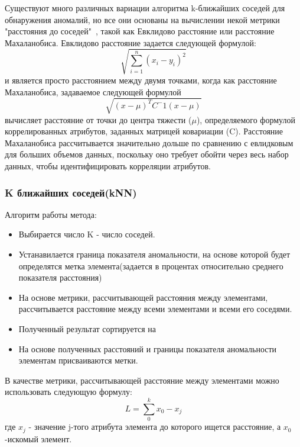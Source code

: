 Существуют много  различных вариации алгоритма k-ближайших соседей для обнаружения аномалий, но все они основаны на вычислении некой метрики "расстояния до соседей"\ , такой как Евклидово расстояние или  расстояние Махаланобиса. Евклидово расстояние задается следующей формулой:
 	\begin{equation}
 	\sqrt{\sum_{i=1}^n(x_i-y_i)^2}
 		\end{equation}
 и является просто расстоянием между двумя точками, когда как  расстояние Махаланобиса, задаваемое следующей формулой
 	\begin{equation}
 	\sqrt{(x-\mu)^T C^-1 (x-\mu)}
 	\end{equation}
 	вычисляет расстояние от точки до центра тяжести ($\mu$), определяемого формулой коррелированных атрибутов, заданных матрицей ковариации (C). Расстояние  Махаланобиса
 	рассчитывается значительно дольше по сравнению с евлидковым
 	  для больших объемов данных, поскольку оно требует
 	обойти через весь набор данных, чтобы идентифицировать корреляции атрибутов.

 \subsubsection{K ближайших соседей(kNN)}
 Алгоритм работы метода:
 \begin{itemize}
 	\item Выбирается число K - число соседей.
 	\item Устанавилается граница показателя аномальности, на основе которой будет определятся метка элемента(задается в процентах относительно среднего показателя расстояния)
 	\item На основе метрики, рассчитывающей расстояния между элементами,  рассчитывается	 расстояние между всеми элементами и всеми его соседями.
 	\item Полученный результат сортируется на 
 	\item На основе полученных расстояний и границы показателя аномальности элементам присваиваются метки.
 \end{itemize}
 В качестве метрики, рассчитывающей расстояние между элементами можно использовать следующую формулу:
 \begin{equation}
 L=\sum_{0}^{k}x_{0} - x_{j}
 \end{equation}
 где $x_{j}$ - значение j-того атрибута элемента до которого ищется расстояние, а $x_0$-искомый элемент.

